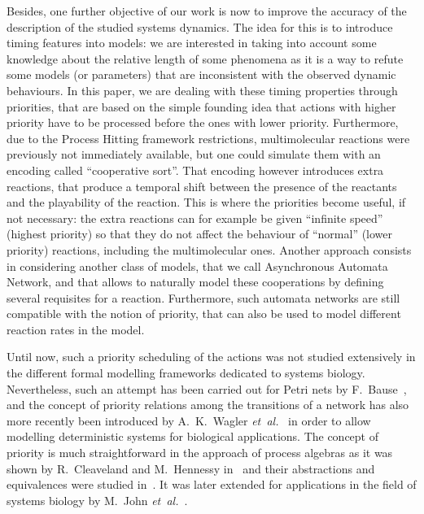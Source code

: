 Besides, one further objective of our work is now %
to improve the accuracy of the description of the studied systems dynamics.
The idea for this is to introduce timing features into models:
we are interested in taking into account some knowledge about the relative length of some phenomena as it is a way to refute some models (or parameters) that are inconsistent with the observed dynamic behaviours.
In this paper, we are dealing with these timing properties through priorities,
that are based on the simple founding idea that actions with higher priority have to be processed before the ones with lower priority.
Furthermore, due to the Process Hitting framework restrictions, multimolecular reactions were previously not immediately available, but one could simulate them with an encoding called “cooperative sort”.
That encoding however introduces extra reactions,
that produce a temporal shift between the presence of the reactants
and the playability of the reaction.
This is where the priorities become useful, if not necessary:
the extra reactions can for example be given “infinite speed” (highest priority) so that they do not affect the behaviour of “normal” (lower priority) reactions, including the multimolecular ones.
Another approach consists in considering another class of models,
that we call Asynchronous Automata Network,
and that allows to naturally model these cooperations
by defining several requisites for a reaction.
Furthermore, such automata networks are still compatible with the notion of priority,
that can also be used to model different reaction rates in the model.

Until now, such a priority scheduling of the actions was not studied extensively in the different formal modelling frameworks dedicated to systems biology.
Nevertheless, such an attempt has been carried out for Petri nets by F.~Bause~\cite{Bause97},
and the concept of priority relations among the transitions of a network has also more recently been introduced by A.~K.~Wagler \textit{et~al.}~\cite{waw,WaglerW12} in order to allow modelling deterministic systems for biological applications.
The concept of priority is much straightforward in the approach of process algebras as it was shown by R.~Cleaveland and M.~Hennessy in~\cite{Cleaveland199058,Cleaveland99prioritiesin} and their abstractions and equivalences were studied in~\cite{Cleaveland:2007:PAP:1282576.1282847}.
It was later extended for applications in the field of systems biology by M.~John \textit{et~al.}~\cite{jlnu2010}.

